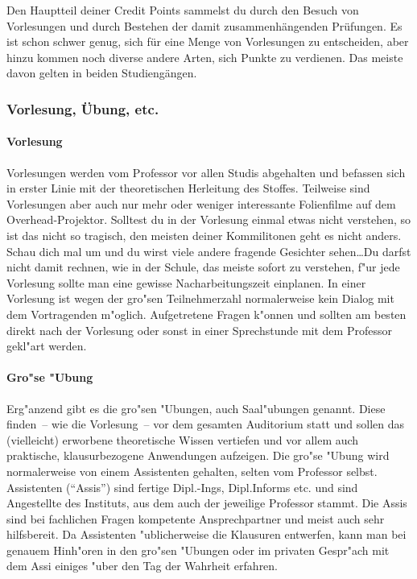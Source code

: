 Den Hauptteil deiner  Credit Points sammelst du durch den Besuch von
Vorlesungen und durch Bestehen der damit zusammenhängenden Prüfungen. Es
ist schon schwer genug, sich für eine Menge von Vorlesungen zu
entscheiden, aber hinzu kommen noch diverse andere Arten, sich Punkte zu
verdienen. Das meiste davon gelten in beiden Studiengängen.
\subsubsection{Vorlesung, Übung, etc.}
\paragraph*{Vorlesung}

Vorlesungen werden vom Professor vor allen Studis abgehalten und befassen
sich in erster Linie mit der theoretischen Herleitung des Stoffes. Teilweise
sind Vorlesungen aber auch nur mehr oder weniger interessante Folienfilme auf
dem Overhead-Projektor. Solltest du in der Vorlesung einmal etwas nicht
verstehen, so ist das nicht so tragisch, den meisten deiner Kommilitonen geht
es nicht anders. Schau dich mal um und du wirst viele andere fragende Gesichter
sehen\ldots Du darfst nicht damit rechnen, wie in der Schule, das meiste sofort zu
verstehen, f"ur jede Vorlesung sollte man eine gewisse Nacharbeitungszeit
einplanen. In einer Vorlesung ist wegen der gro"sen Teilnehmerzahl
normalerweise kein Dialog mit dem Vortragenden m"oglich. Aufgetretene Fragen
k"onnen und sollten am besten direkt nach der Vorlesung oder sonst in einer
Sprechstunde mit dem Professor gekl"art werden.


\paragraph*{Gro"se "Ubung}

Erg"anzend gibt es die gro"sen "Ubungen, auch Saal"ubungen genannt. Diese
finden~-- wie die Vorlesung~-- vor dem gesamten Auditorium statt und sollen das
(vielleicht) erworbene theoretische Wissen vertiefen und vor allem auch
praktische, klausurbezogene Anwendungen aufzeigen. Die gro"se "Ubung wird
normalerweise von einem Assistenten gehalten, selten vom Professor selbst.
Assistenten ("`Assis"') sind fertige Dipl.-Ings, Dipl.Informs etc. und sind
Angestellte des Instituts, aus dem auch der jeweilige Professor stammt. Die
Assis sind bei fachlichen Fragen kompetente Ansprechpartner und meist auch sehr
hilfsbereit. Da Assistenten "ublicherweise die Klausuren entwerfen, kann man
bei genauem Hinh"oren in den gro"sen "Ubungen oder im privaten Gespr"ach mit
dem Assi einiges "uber den Tag der Wahrheit erfahren.


